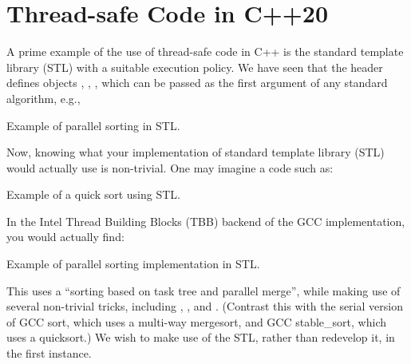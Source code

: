 \section{Thread-safe Code in C++20}

A prime example of the use of thread-safe code in C++ is the standard template library (STL) with a suitable execution policy. We have seen that the header  defines objects , , , which can be passed as the first argument of any standard algorithm, e.g., \\

\begin{codebox}[breakable]{}
\footnotesize Example of parallel sorting in STL.
\tcblower
{}
\end{codebox}

Now, knowing what your implementation of standard template library (STL) would actually use is non-trivial. One may imagine a code such as:

\begin{codebox}[breakable]{}
\footnotesize Example of a quick sort using STL.
\tcblower
{}
\end{codebox}

In the Intel Thread Building Blocks (TBB) backend of the GCC implementation, you would actually find: 

\begin{codebox}[breakable]{}
\footnotesize Example of parallel sorting implementation in STL.
\tcblower
{}
\end{codebox}

This uses a ``sorting based on task tree and parallel merge'', while making use of several non-trivial tricks, including , , and . (Contrast this with the serial version of GCC sort, which uses a multi-way mergesort, and GCC stable\_sort, which uses a quicksort.) We wish to make use of the STL, rather than redevelop it, in the first instance. 


